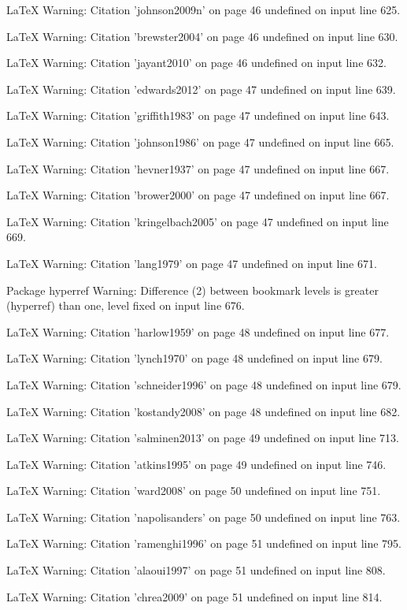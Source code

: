 LaTeX Warning: Citation 'johnson2009n' on page 46 undefined on input line 625.


LaTeX Warning: Citation 'brewster2004' on page 46 undefined on input line 630.


LaTeX Warning: Citation 'jayant2010' on page 46 undefined on input line 632.


LaTeX Warning: Citation 'edwards2012' on page 47 undefined on input line 639.


LaTeX Warning: Citation 'griffith1983' on page 47 undefined on input line 643.


LaTeX Warning: Citation 'johnson1986' on page 47 undefined on input line 665.


LaTeX Warning: Citation 'hevner1937' on page 47 undefined on input line 667.


LaTeX Warning: Citation 'brower2000' on page 47 undefined on input line 667.


LaTeX Warning: Citation 'kringelbach2005' on page 47 undefined on input line 669.


LaTeX Warning: Citation 'lang1979' on page 47 undefined on input line 671.


Package hyperref Warning: Difference (2) between bookmark levels is greater 
(hyperref)                than one, level fixed on input line 676.


LaTeX Warning: Citation 'harlow1959' on page 48 undefined on input line 677.


LaTeX Warning: Citation 'lynch1970' on page 48 undefined on input line 679.


LaTeX Warning: Citation 'schneider1996' on page 48 undefined on input line 679.


LaTeX Warning: Citation 'kostandy2008' on page 48 undefined on input line 682.


LaTeX Warning: Citation 'salminen2013' on page 49 undefined on input line 713.


LaTeX Warning: Citation 'atkins1995' on page 49 undefined on input line 746.


LaTeX Warning: Citation 'ward2008' on page 50 undefined on input line 751.


LaTeX Warning: Citation 'napolisanders' on page 50 undefined on input line 763.


LaTeX Warning: Citation 'ramenghi1996' on page 51 undefined on input line 795.


LaTeX Warning: Citation 'alaoui1997' on page 51 undefined on input line 808.


LaTeX Warning: Citation 'chrea2009' on page 51 undefined on input line 814.


